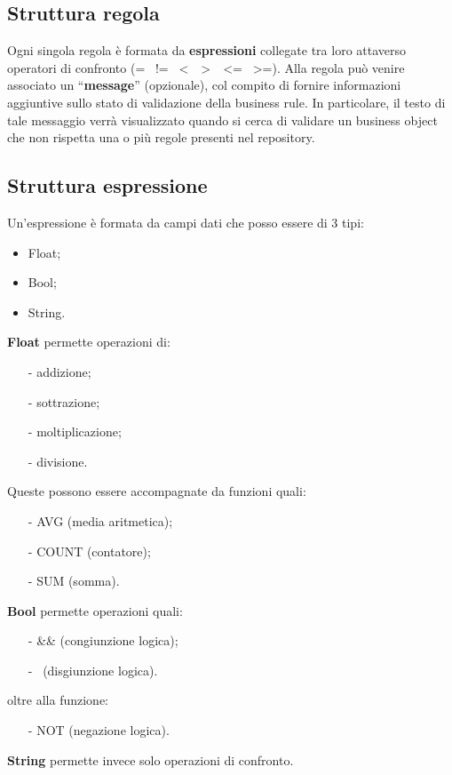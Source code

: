 \subsection{Struttura regola}
Ogni singola regola \`e formata da \textbf{espressioni} collegate tra loro attaverso operatori di confronto (= \textbar\ != \textbar\ \textless\ \textbar\ \textgreater\ \textbar\ \textless= \textbar\ \textgreater=). Alla regola pu\`o venire associato un ``\textbf{message}'' (opzionale), col compito di fornire informazioni aggiuntive sullo stato di validazione della business rule. In particolare, il testo di tale messaggio verr\`a visualizzato quando si cerca di validare un business object che non rispetta una o pi\`u regole presenti nel repository.
\subsection{Struttura espressione}
Un'espressione \`e formata da campi dati che posso essere di 3 tipi:
\begin{itemize}
\item Float;
\item Bool;
\item String. 
\end{itemize}
\textbf{Float} permette operazioni di:
\begin{itemize}
\item[-] addizione;
\item[-] sottrazione;
\item[-] moltiplicazione;
\item[-] divisione.
\end{itemize}
Queste possono essere accompagnate da funzioni quali:
\begin{itemize}
\item[-] AVG (media aritmetica);
\item[-] COUNT (contatore);
\item[-] SUM (somma). 
\end{itemize}
\textbf{Bool} permette operazioni quali:
\begin{itemize}
\item[-] \&\& (congiunzione logica);
\item[-] \textbar\textbar\ (disgiunzione logica).
\end{itemize}
oltre alla funzione:
\begin{itemize}
\item[-] NOT (negazione logica). 
\end{itemize}
\textbf{String} permette invece solo operazioni di confronto.
